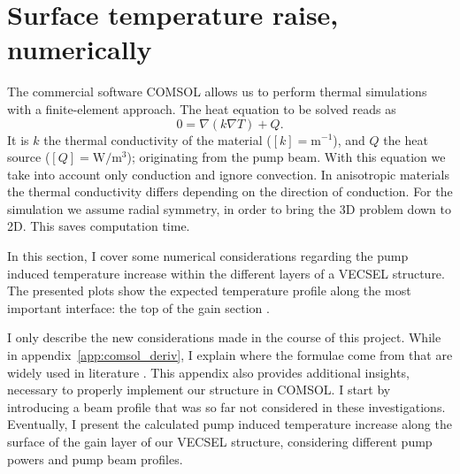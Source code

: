 \section{Surface temperature raise, numerically}
\label{sec:comsol}

The commercial software COMSOL
allows us to perform thermal simulations
with a finite-element approach.
The heat equation
to be solved
reads as
\begin{equation}
0 = \nabla(k\nabla T) + Q.
\label{eq:heateq}
\end{equation}
It is $k$ the thermal conductivity of the material
($[k]=\mathrm{m}^{-1}$),
and $Q$ the heat source
($[Q]=\mathrm{W}/\mathrm{m}^3$);
originating from the pump beam.
With this equation we take into account
only conduction
and ignore convection.
In anisotropic materials
the thermal conductivity differs
depending on the direction of conduction.
For the simulation we assume radial symmetry,
in order to bring the 3D problem down to 2D.
This saves computation time.

In this section,
I cover some numerical considerations
regarding the pump induced
temperature increase
within the different layers
of a VECSEL structure.
The presented plots
show the expected temperature profile
along the most important interface:
the top of the gain section \cite{Ranta2014OptLett}.

I only describe
the new considerations
made in the course
of this project.
While in appendix~\ref{app:comsol_deriv},
I explain
where the formulae come from
that are widely used in literature
\cite{Ranta2014OptLett,Kemp2008,Kemp2005,Vetter2012,Lindberg2005}.
This appendix also provides
additional insights,
necessary to properly implement
our structure in COMSOL.
I start by introducing
a beam profile
that was so far not considered
in these investigations.
Eventually,
I present
the calculated
pump induced temperature increase
along the surface of the gain layer
of our VECSEL structure,
considering different pump powers
and pump beam profiles.








